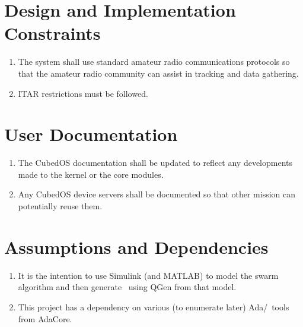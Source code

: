 \section{Design and Implementation Constraints}

\begin{enumerate}
\item The system shall use standard amateur radio communications protocols so that the amateur
  radio community can assist in tracking and data gathering. 
\item ITAR restrictions must be followed.
\end{enumerate}

\section{User Documentation}

\begin{enumerate}
\item The CubedOS documentation shall be updated to reflect any developments made to the kernel
  or the core modules.
\item Any CubedOS device servers shall be documented so that other mission can potentially reuse
  them.
\end{enumerate}

\section{Assumptions and Dependencies}

\begin{enumerate}
\item It is the intention to use Simulink (and MATLAB) to model the swarm algorithm and then
  generate \SPARK\ using QGen from that model.
\item This project has a dependency on various (to enumerate later) Ada/\SPARK\ tools from
  AdaCore.
\end{enumerate}
